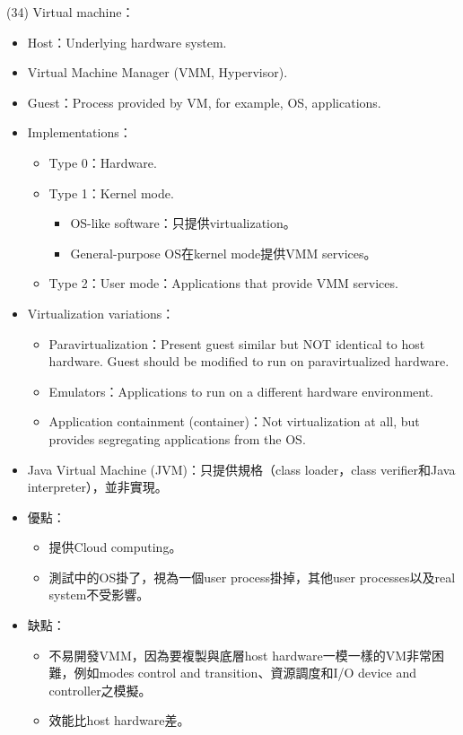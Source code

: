 \item \begin{theorem}{(34)} Virtual machine：\begin{itemize}
        \item Host：Underlying hardware system.
        \item Virtual Machine Manager (VMM, Hypervisor).
        \item Guest：Process provided by VM, for example, OS, applications.
        \item Implementations：\begin{itemize}
            \item Type 0：Hardware.
            \item Type 1：Kernel mode. \begin{itemize}
                \item OS-like software：只提供virtualization。
                \item General-purpose OS在kernel mode提供VMM services。
            \end{itemize}
            \item Type 2：User mode：Applications that provide VMM services.
        \end{itemize}
        \item Virtualization variations：\begin{itemize}
            \item Paravirtualization：Present guest similar but NOT identical to host hardware. Guest should be modified to run on paravirtualized hardware.
            \item Emulators：Applications to run on a different hardware environment.
            \item Application containment (container)：Not virtualization at all, but provides segregating applications from the OS.
        \end{itemize}
        \item Java Virtual Machine (JVM)：只提供規格（class loader，class verifier和Java interpreter），並非實現。
        \item 優點：\begin{itemize}
            \item 提供Cloud computing。
            \item 測試中的OS掛了，視為一個user process掛掉，其他user processes以及real system不受影響。
        \end{itemize}
        \item 缺點：\begin{itemize}
            \item 不易開發VMM，因為要複製與底層host hardware一模一樣的VM非常困難，例如modes control and transition、資源調度和I/O device and controller之模擬。
            \item 效能比host hardware差。
        \end{itemize}
    \end{itemize}
\end{theorem}

